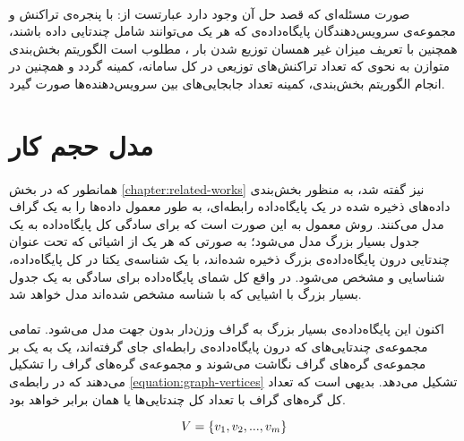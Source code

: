 \paragraph*{}
صورت مسئله‌ای که قصد حل آن وجود دارد عبارتست از: با پنجره‌ی تراکنش
\lr{$ \window $}
و مجموعه‌ی
\lr{$ \numberOfServers $}
سرویس‌دهندگان پایگاه‌داده‌ی
\lr{$ \servers $}
که هر یک می‌توانند شامل
\lr{$ \numberOfTuples $}
چندتایی داده باشند، همچنین با تعریف میزان غیر همسان توزیع شدن بار
\lr{$ \imbalanceRatio $}،
مطلوب است الگوریتم بخش‌بندی متوازن
\lr{$ \clusteringAlgorithm $}
به نحوی که تعداد تراکنش‌های توزیعی در کل سامانه، کمینه گردد و همچنین در انجام الگوریتم بخش‌بندی، کمینه تعداد جابجایی‌های بین سرویس‌دهنده‌ها صورت گیرد.

\section{مدل حجم کار}

\paragraph*{}
همانطور که در بخش
\ref{chapter:related-works}
نیز گفته شد، به منظور بخش‌بندی داده‌های ذخیره شده در یک پایگاه‌داده رابطه‌ای، به طور معمول داده‌ها را به یک گراف مدل می‌کنند. روش معمول به این صورت است که برای سادگی کل پایگاه‌داده به یک جدول بسیار بزرگ مدل می‌شود؛ به صورتی که هر یک از اشیائی که تحت عنوان چندتایی درون پایگاه‌داده‌ی بزرگ ذخیره شده‌اند، با یک شناسه‌ی یکتا در کل پایگاه‌داده، شناسایی و مشخص می‌شود. در واقع کل شمای پایگاه‌داده برای سادگی به یک جدول بسیار بزرگ با اشیایی که با شناسه مشخص شده‌اند مدل خواهد شد.

\paragraph*{}
اکنون این پایگاه‌داده‌ی بسیار بزرگ به گراف وزن‌دار بدون جهت
\lr{$ \graph = \left( \vertices, \edges \right) $}
مدل می‌شود. تمامی مجموعه‌ی چند‌تایی‌های
\lr{$ \tuples $}
که درون پایگاه‌داده‌ی رابطه‌ای جای گرفته‌اند، یک به یک بر مجموعه‌ی گره‌های گراف
\lr{$ \graph $}
نگاشت می‌شوند و مجموعه‌ی گره‌های گراف را تشکیل می‌دهند که در رابطه‌ی
\ref{equation:graph-vertices}
تشکیل می‌دهد. بدیهی است که تعداد کل گره‌های گراف با تعداد کل چند‌تایی‌ها یا همان
\lr{$ \numberOfTuples $}
برابر خواهد بود.

\begin{latin}
	\begin{equation} \label{equation:graph-vertices}
		V = \left \{ v_{1}, v_{2}, ..., v_{m} \right \}
	\end{equation}
\end{latin}

